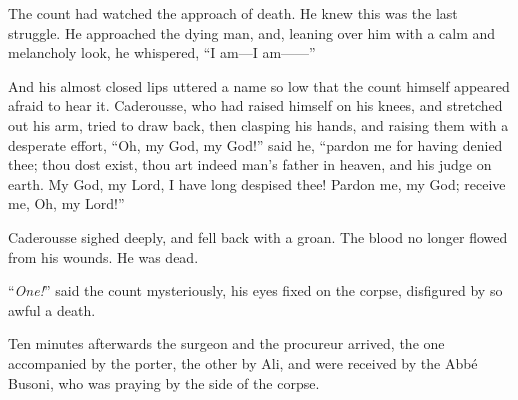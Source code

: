The count had watched the approach of death. He knew this was the last
struggle. He approached the dying man, and, leaning over him with a
calm and melancholy look, he whispered, “I am—I am——”

And his almost closed lips uttered a name so low that the count himself
appeared afraid to hear it. Caderousse, who had raised himself on his
knees, and stretched out his arm, tried to draw back, then clasping his
hands, and raising them with a desperate effort, “Oh, my God, my God!”
said he, “pardon me for having denied thee; thou dost exist, thou art
indeed man’s father in heaven, and his judge on earth. My God, my Lord,
I have long despised thee! Pardon me, my God; receive me, Oh, my Lord!”

Caderousse sighed deeply, and fell back with a groan. The blood no
longer flowed from his wounds. He was dead.

“\textit{One!}” said the count mysteriously, his eyes fixed on the corpse,
disfigured by so awful a death.

Ten minutes afterwards the surgeon and the procureur arrived, the one
accompanied by the porter, the other by Ali, and were received by the
Abbé Busoni, who was praying by the side of the corpse.
